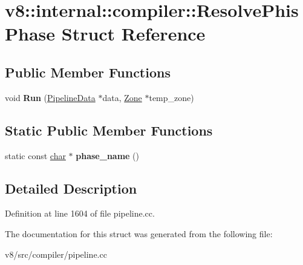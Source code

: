 \hypertarget{structv8_1_1internal_1_1compiler_1_1ResolvePhisPhase}{}\section{v8\+:\+:internal\+:\+:compiler\+:\+:Resolve\+Phis\+Phase Struct Reference}
\label{structv8_1_1internal_1_1compiler_1_1ResolvePhisPhase}
\subsection*{Public Member Functions}
\begin{DoxyCompactItemize}
\item 
\mbox{\label{structv8_1_1internal_1_1compiler_1_1ResolvePhisPhase_a49f895e0ae2dc93df7523d04d30c5481}} 
void {\bfseries Run} (\mbox{\hyperlink{classv8_1_1internal_1_1compiler_1_1PipelineData}{Pipeline\+Data}} $\ast$data, \mbox{\hyperlink{classv8_1_1internal_1_1Zone}{Zone}} $\ast$temp\+\_\+zone)
\end{DoxyCompactItemize}
\subsection*{Static Public Member Functions}
\begin{DoxyCompactItemize}
\item 
\mbox{\label{structv8_1_1internal_1_1compiler_1_1ResolvePhisPhase_a8b1c5d7d1bb306937e452126b8f8b791}} 
static const \mbox{\hyperlink{classchar}{char}} $\ast$ {\bfseries phase\+\_\+name} ()
\end{DoxyCompactItemize}


\subsection{Detailed Description}


Definition at line 1604 of file pipeline.\+cc.



The documentation for this struct was generated from the following file\+:\begin{DoxyCompactItemize}
\item 
v8/src/compiler/pipeline.\+cc\end{DoxyCompactItemize}

